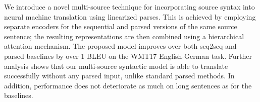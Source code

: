 We introduce a novel multi-source technique for incorporating source syntax into neural machine translation using linearized parses. This is achieved by employing separate encoders for the sequential and parsed versions of the same source sentence; the resulting representations are then combined using a hierarchical attention mechanism. The proposed model improves over both seq2seq and parsed baselines by over 1 BLEU on the WMT17 English-German task. Further analysis shows that our multi-source syntactic model is able to translate successfully without any parsed input, unlike standard parsed methods. In addition, performance does not deteriorate as much on long sentences as for the baselines.
